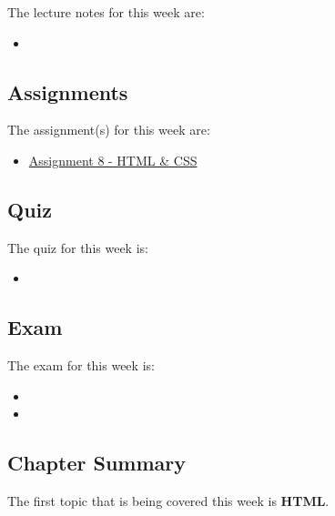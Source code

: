 \noindent The lecture notes for this week are:

\begin{itemize}
    \item {}
\end{itemize}

\subsection{Assignments}

The assignment(s) for this week are:

\begin{itemize}
    \item \href{https://github.com/QuantumCompiler/CU/tree/main/CSPB%203308%20-%20Software%20Development%20Methods%20And%20Tools/Assignments/Assignment%208%20-%20HTML%20%26%20CSS}{Assignment 8 - HTML \& CSS}
\end{itemize}

\subsection{Quiz}

The quiz for this week is:

\begin{itemize}
    \item {}
\end{itemize}

\subsection{Exam}

The exam for this week is:

\begin{itemize}
    \item {}
    \item {}
\end{itemize}

\newpage

\subsection{Chapter Summary}

The first topic that is being covered this week is \textbf{HTML}.

